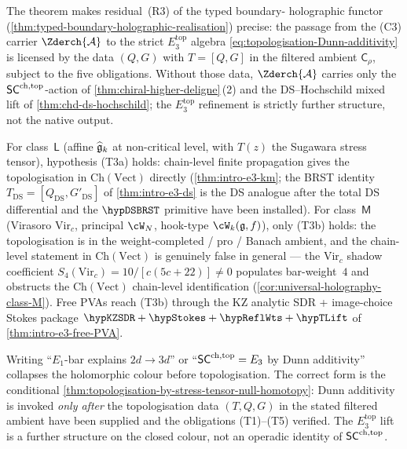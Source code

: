 \begin{remark}%
\label{rem:topologisation-as-R3-of-Phihol}%
%
The theorem makes residual~\textup{(R3)} of the typed boundary-
holographic functor
(\cref{thm:typed-boundary-holographic-realisation}) precise: the passage from the (C3)
carrier $\Zderch{\cA}$ to the strict $E_{3}^{\mathrm{top}}$ algebra
\eqref{eq:topologisation-Dunn-additivity} is licensed by the data
$(Q, G)$ with $T = [Q, G]$ in the filtered ambient
$\mathsf{C}_{\rho}$, subject to the five obligations.  Without those
data, $\Zderch{\cA}$ carries only the $\mathsf{SC}^{\mathrm{ch},\mathrm{top}}$-action of
\cref{thm:chiral-higher-deligne}\,(2) and the DS--Hochschild mixed
lift of \cref{thm:chd-ds-hochschild}; the $E_{3}^{\mathrm{top}}$
refinement is strictly further structure, not the native output.
\end{remark}

\begin{remark}%
\label{rem:class-L-vs-class-M-topologisation}%
%
For class~$\mathsf{L}$ (affine $\widehat{\mathfrak{g}}_{k}$ at non-critical
level, with $T(z)$ the Sugawara stress tensor), hypothesis
\textup{(T3a)} holds: chain-level finite propagation gives the
topologisation in $\mathrm{Ch}(\mathrm{Vect})$ directly
(\cref{thm:intro-e3-km}; the BRST identity
$T_{\mathrm{DS}} = [Q_{\mathrm{DS}}, G'_{\mathrm{DS}}]$ of
\cref{thm:intro-e3-ds} is the DS analogue after the total DS
differential and the \(\hypDSBRST\) primitive have been installed). For
class~$\mathsf{M}$ (Virasoro $\mathrm{Vir}_{c}$, principal $\cW_{N}$,
hook-type $\cW_{k}(\fg, f)$), only \textup{(T3b)} holds: the
topologisation is in the weight-completed / pro / Banach ambient,
and the chain-level statement in $\mathrm{Ch}(\mathrm{Vect})$ is
genuinely false in general --- the $\mathrm{Vir}_{c}$ shadow
coefficient $S_{4}(\mathrm{Vir}_{c}) = 10/[c(5c+22)] \ne 0$
populates bar-weight~$4$ and obstructs the
$\mathrm{Ch}(\mathrm{Vect})$ chain-level identification
(\cref{cor:universal-holography-class-M}).  Free PVAs reach
\textup{(T3b)} through the KZ analytic SDR + image-choice Stokes
package $\hypKZSDR + \hypStokes + \hypReflWts + \hypTLift$ of
\cref{thm:intro-e3-free-PVA}.
\end{remark}

\begin{remark}%
\label{rem:forbidden-slogan-3-as-T-violation}%
%
Writing ``$E_{1}$-bar explains $2d \to 3d$'' or ``$\mathsf{SC}^{\mathrm{ch},\mathrm{top}} = E_{3}$
by Dunn additivity'' collapses the holomorphic colour before
topologisation.  The correct form is the conditional
\cref{thm:topologisation-by-stress-tensor-null-homotopy}: Dunn
additivity is invoked \emph{only after} the topologisation data
$(T, Q, G)$ in the stated filtered ambient have been supplied
and the obligations \textup{(T1)}--\textup{(T5)} verified.  The
$E_{3}^{\mathrm{top}}$ lift is a further structure on the closed
colour, not an operadic identity of $\mathsf{SC}^{\mathrm{ch},\mathrm{top}}$.
\end{remark}

